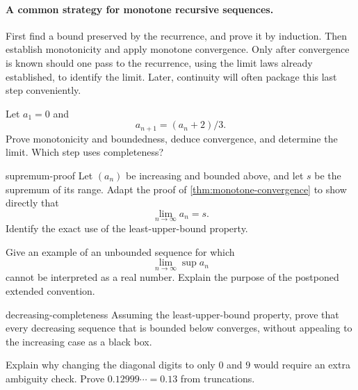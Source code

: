 \paragraph{A common strategy for monotone recursive sequences.}
First find a bound preserved by the recurrence, and prove it by induction.
Then establish monotonicity and apply monotone convergence. Only after
convergence is known should one pass to the recurrence, using the limit
laws already established, to identify the limit. Later, continuity will
often package this last step conveniently.

\begin{exercise}
Let $a_1=0$ and
\[
a_{n+1}=(a_n+2)/3.
\]
 Prove monotonicity and boundedness, deduce convergence, and determine the limit. Which step uses completeness?
\end{exercise}

\begin{hexercise}{supremum-proof}
Let $(a_n)$ be increasing and bounded above, and let $s$ be the supremum of its range. Adapt the proof of \cref{thm:monotone-convergence} to show directly that
\[
\lim_{n\to\infty}a_n=s.
\]
Identify the exact use of the least-upper-bound property.
\end{hexercise}

\begin{exercise}
Give an example of an unbounded sequence for which
\[
\lim_{n\to\infty}\sup a_n
\]
cannot be interpreted as a real number. Explain the purpose of the postponed extended convention.
\end{exercise}

\begin{hexercise}{decreasing-completeness}
Assuming the least-upper-bound property, prove that every decreasing sequence that is bounded below converges, without appealing to the increasing case as a black box.
\end{hexercise}

\begin{exercise}
Explain why changing the diagonal digits to only $0$ and $9$ would require
an extra ambiguity check. Prove $0.12999\cdots=0.13$ from truncations.
\end{exercise}
